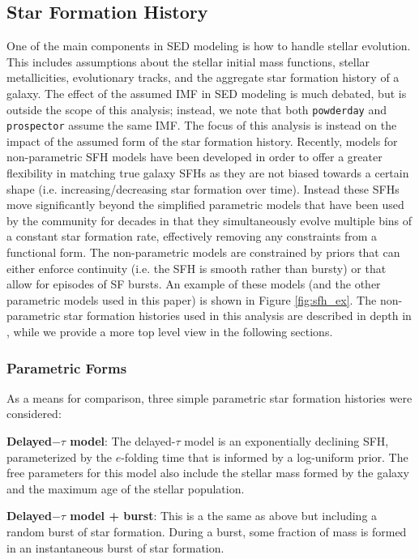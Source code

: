 \documentclass[twocolumn]{aastex62}
\begin{document}
\subsection{Star Formation History}

One of the main components in SED modeling is how to handle stellar evolution. This includes assumptions about the stellar initial mass functions, stellar metallicities, evolutionary tracks, and the aggregate star formation history of a galaxy. The effect of the assumed IMF in SED modeling is much debated, but is outside the scope of this analysis; instead, we note that both \texttt{powderday} and \texttt{prospector} assume the same IMF. The focus of this analysis is instead on the impact of the assumed form of the star formation history. Recently, models for non-parametric SFH models have been developed in order to offer a greater flexibility in matching true galaxy SFHs as they are not biased towards a certain shape (i.e. increasing/decreasing star formation over time). Instead these SFHs move significantly beyond the simplified parametric models that have been used by the community for decades in that they simultaneously evolve multiple bins of a constant star formation rate, effectively removing any constraints from a functional form. The non-parametric models are constrained by priors that can either enforce continuity (i.e. the SFH is smooth rather than bursty) or that allow for episodes of SF bursts. An example of these models (and the other parametric models used in this paper) is shown in Figure \ref{fig:sfh_ex}. The non-parametric star formation histories used in this analysis are described in depth in \citet{leja_how_2019}, while we provide a more top level view in the following sections. 



\subsubsection{Parametric Forms}

As a means for comparison, three simple parametric star formation histories were considered:

\textbf{Delayed$-\tau$ model}: The delayed-$\tau$ model is an exponentially declining SFH, parameterized by the $e$-folding time that is informed by a log-uniform prior. The free parameters for this model also include the stellar mass formed by the galaxy and the maximum age of the stellar population. 

\textbf{Delayed$-\tau$ model + burst}: This is a the same as above but including a random burst of star formation. During a burst, some fraction of mass is formed in an instantaneous burst of star formation. 
\end{document}
